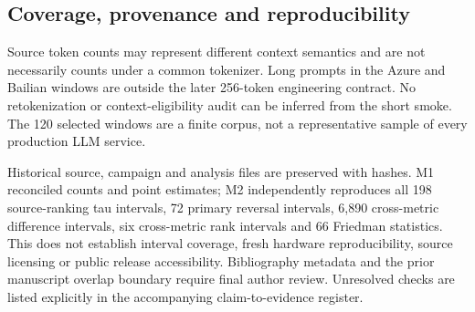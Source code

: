 \subsection{Coverage, provenance and reproducibility}
Source token counts may represent different context semantics and are not
necessarily counts under a common tokenizer. Long prompts in the Azure and
Bailian windows are outside the later 256-token engineering contract. No
retokenization or context-eligibility audit can be inferred from the short
smoke. The 120 selected windows are a finite corpus, not a representative
sample of every production LLM service.

Historical source, campaign and analysis files are preserved with hashes.
M1 reconciled counts and point estimates; M2 independently reproduces all
198 source-ranking tau intervals, 72 primary reversal intervals, 6,890
cross-metric difference intervals, six cross-metric rank intervals and
66 Friedman statistics. This does not establish interval coverage, fresh
hardware reproducibility, source licensing or public release accessibility. Bibliography metadata and the prior
manuscript overlap boundary require final author review. Unresolved
checks are listed explicitly in the accompanying claim-to-evidence register.
